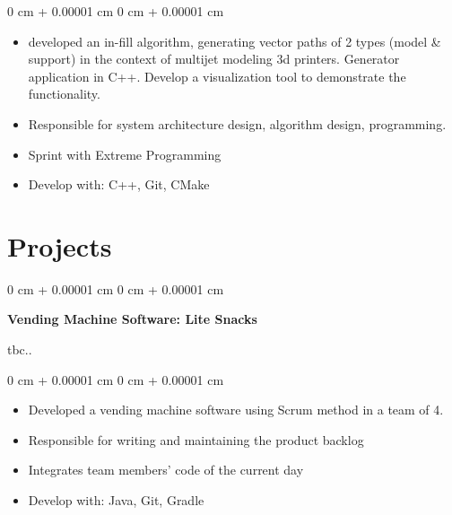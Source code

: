 \documentclass[10pt, letterpaper]{article}
\newenvironment{highlights}{
    \begin{itemize}[
        topsep=0.10 cm,
        parsep=0.10 cm,
        partopsep=0pt,
        itemsep=0pt,
        leftmargin=0 cm + 10pt
    ]
}{
    \end{itemize}
} %
\newenvironment{onecolentry}{
    \begin{adjustwidth}{
        0 cm + 0.00001 cm
    }{
        0 cm + 0.00001 cm
    }
}{
    \end{adjustwidth}
} %
\newenvironment{twocolentry}[2][]{
    \onecolentry
    \def\secondColumn{#2}
    \setcolumnwidth{\fill, 4.5 cm}
    \begin{paracol}{2}
}{
    \switchcolumn \raggedleft \secondColumn
    \end{paracol}
    \endonecolentry
} %
\begin{document}
        \vspace{0.10 cm}
        \begin{onecolentry}
            \begin{highlights}
                \item developed an in-fill algorithm, generating vector paths of 2 types (model \& support) in the context of multijet modeling 3d printers. Generator application in C++. Develop a visualization tool to demonstrate the functionality.
                \item Responsible for system architecture design, algorithm design, programming.
                \item Sprint with Extreme Programming
                \item Develop with: C++, Git, CMake
            \end{highlights}
        \end{onecolentry}

    \section{Projects}
        \begin{twocolentry}{tbc..}
            \textbf{Vending Machine Software: Lite Snacks}
        \end{twocolentry}
        \vspace{0.10 cm}
        \begin{onecolentry}
            \begin{highlights}
                \item Developed a vending machine software using Scrum method in a team of 4.
                \item Responsible for writing and maintaining the product backlog
                \item Integrates team members' code of the current day
                \item Develop with: Java, Git, Gradle
            \end{highlights}
        \end{onecolentry} 
        \vspace{0.2 cm}
\end{document}
